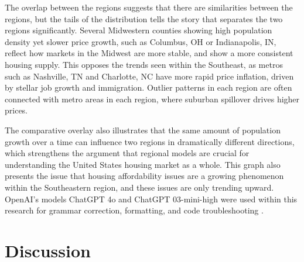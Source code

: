\documentclass[journal,article,submit,pdftex,moreauthors]{Definitions/mdpi}
\begin{document}
 The overlap between the regions suggests that there are similarities between the regions, but the tails of the distribution tells the story that separates the two regions significantly. Several Midwestern counties showing high population density yet slower price growth, such as Columbus, OH or Indianapolis, IN, reflect how markets in the Midwest are more stable, and show a more consistent housing supply. This opposes the trends seen within the Southeast, as metros such as Nashville, TN and Charlotte, NC have more rapid price inflation, driven by stellar job growth and immigration. Outlier patterns in each region are often connected with metro areas in each region, where suburban spillover drives higher prices.

The comparative overlay also illustrates that the same amount of population growth over a time can influence two regions in dramatically different directions, which strengthens the argument that regional models are crucial for understanding the United States housing market as a whole. This graph also presents the issue that housing affordability issues are a growing phenomenon within the Southeastern region, and these issues are only trending upward. OpenAI’s models ChatGPT 4o and ChatGPT 03-mini-high were used within this research for grammar correction, formatting, and code troubleshooting \citep{openai_2025_chatgpt}.

\begin{comment}
\textcolor{red}{OpenAI’s models ChatGPT 4o and ChatGPT 03-mini-high were used within this research for grammar correction, formatting, and code troubleshooting \citep{openai_2025_chatgpt}.}
\end{comment}


\section{Discussion}
\end{document}

